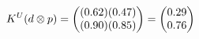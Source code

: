 \documentclass[preview]{standalone}
\begin{document}
\begin{align*}
\special{dvisvgm:raw <g id='unique000'>}K^U(d \otimes p) = \begin{pmatrix} (0.62)(0.47) \\ (0.90)(0.85) \end{pmatrix} = \begin{pmatrix} 0.29 \\ 0.76 \end{pmatrix}\special{dvisvgm:raw </g>}
\end{align*}
\end{document}
